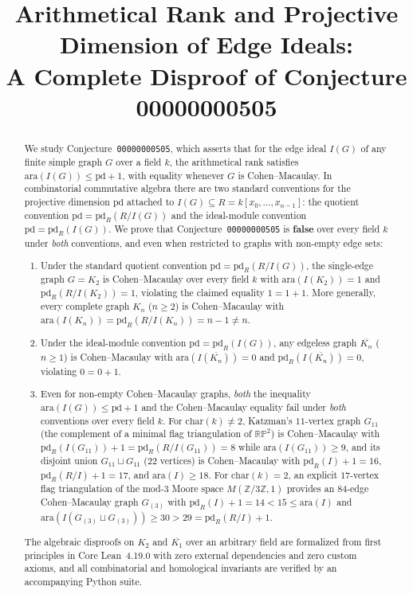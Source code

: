 \documentclass[11pt,a4paper]{amsart}
\title[Disproof of Conjecture 00000000505 on Edge Ideals]{Arithmetical Rank and Projective Dimension of Edge Ideals:\\ A Complete Disproof of Conjecture 00000000505}
\date{}
\theoremstyle{plain}
\theoremstyle{definition}
\newcommand{\ara}{\mathrm{ara}}
\newcommand{\pd}{\mathrm{pd}}
\newcommand{\RP}{\mathbb{RP}}
\newcommand{\ZZ}{\mathbb{Z}}
\begin{document}
\begin{abstract}
We study Conjecture~\texttt{00000000505}, which asserts that for the edge ideal $I(G)$ of any finite simple graph $G$ over a field $k$, the arithmetical rank satisfies $\ara(I(G)) \le \pd + 1$, with equality whenever $G$ is Cohen--Macaulay. In combinatorial commutative algebra there are two standard conventions for the projective dimension $\pd$ attached to $I(G) \subseteq R = k[x_0,\dots,x_{n-1}]$: the quotient convention $\pd = \pd_R(R/I(G))$ and the ideal-module convention $\pd = \pd_R(I(G))$. We prove that Conjecture~\texttt{00000000505} is \textbf{false} over every field $k$ under \emph{both} conventions, and even when restricted to graphs with non-empty edge sets:
\begin{enumerate}
  \item[(i)] Under the standard quotient convention $\pd = \pd_R(R/I(G))$, the single-edge graph $G = K_2$ is Cohen--Macaulay over every field $k$ with $\ara(I(K_2)) = 1$ and $\pd_R(R/I(K_2)) = 1$, violating the claimed equality $1 = 1 + 1$. More generally, every complete graph $K_n$ ($n \ge 2$) is Cohen--Macaulay with $\ara(I(K_n)) = \pd_R(R/I(K_n)) = n - 1 \neq n$.
  \item[(ii)] Under the ideal-module convention $\pd = \pd_R(I(G))$, any edgeless graph $\overline{K_n}$ ($n \ge 1$) is Cohen--Macaulay with $\ara(I(\overline{K_n})) = 0$ and $\pd_R(I(\overline{K_n})) = 0$, violating $0 = 0 + 1$.
  \item[(iii)] Even for non-empty Cohen--Macaulay graphs, \emph{both} the inequality $\ara(I(G)) \le \pd + 1$ and the Cohen--Macaulay equality fail under \emph{both} conventions over every field $k$. For $\mathrm{char}(k) \neq 2$, Katzman's $11$-vertex graph $G_{11}$ (the complement of a minimal flag triangulation of $\RP^2$) is Cohen--Macaulay with $\pd_R(I(G_{11})) + 1 = \pd_R(R/I(G_{11})) = 8$ while $\ara(I(G_{11})) \ge 9$, and its disjoint union $G_{11} \sqcup G_{11}$ ($22$ vertices) is Cohen--Macaulay with $\pd_R(I) + 1 = 16$, $\pd_R(R/I) + 1 = 17$, and $\ara(I) \ge 18$. For $\mathrm{char}(k) = 2$, an explicit $17$-vertex flag triangulation of the mod-$3$ Moore space $M(\ZZ/3\ZZ,1)$ provides an $84$-edge Cohen--Macaulay graph $G_{(3)}$ with $\pd_R(I) + 1 = 14 < 15 \le \ara(I)$ and $\ara(I(G_{(3)} \sqcup G_{(3)})) \ge 30 > 29 = \pd_R(R/I) + 1$.
\end{enumerate}
The algebraic disproofs on $K_2$ and $\overline{K_1}$ over an arbitrary field are formalized from first principles in Core Lean~4.19.0 with zero external dependencies and zero custom axioms, and all combinatorial and homological invariants are verified by an accompanying Python suite.
\end{abstract}
\end{document}
